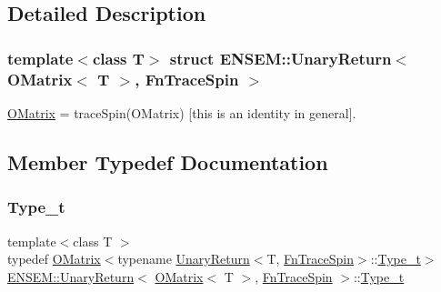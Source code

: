 \subsection{Detailed Description}
\subsubsection*{template$<$class T$>$\newline
struct E\+N\+S\+E\+M\+::\+Unary\+Return$<$ O\+Matrix$<$ T $>$, Fn\+Trace\+Spin $>$}

\mbox{\hyperlink{classENSEM_1_1OMatrix}{O\+Matrix}} = trace\+Spin(\+O\+Matrix) \mbox{[}this is an identity in general\mbox{]}. 

\subsection{Member Typedef Documentation}
\mbox{\label{structENSEM_1_1UnaryReturn_3_01OMatrix_3_01T_01_4_00_01FnTraceSpin_01_4_a9d6cbecc05de075e41d52fd0b7f2b55e}} 
\subsubsection{\texorpdfstring{Type\_t}{Type\_t}\hspace{0.1cm}{\footnotesize\ttfamily [1/3]}}
{\footnotesize\ttfamily template$<$class T $>$ \\
typedef \mbox{\hyperlink{classENSEM_1_1OMatrix}{O\+Matrix}}$<$typename \mbox{\hyperlink{structENSEM_1_1UnaryReturn}{Unary\+Return}}$<$T, \mbox{\hyperlink{structENSEM_1_1FnTraceSpin}{Fn\+Trace\+Spin}}$>$\+::\mbox{\hyperlink{structENSEM_1_1UnaryReturn_3_01OMatrix_3_01T_01_4_00_01FnTraceSpin_01_4_a9d6cbecc05de075e41d52fd0b7f2b55e}{Type\+\_\+t}}$>$ \mbox{\hyperlink{structENSEM_1_1UnaryReturn}{E\+N\+S\+E\+M\+::\+Unary\+Return}}$<$ \mbox{\hyperlink{classENSEM_1_1OMatrix}{O\+Matrix}}$<$ T $>$, \mbox{\hyperlink{structENSEM_1_1FnTraceSpin}{Fn\+Trace\+Spin}} $>$\+::\mbox{\hyperlink{structENSEM_1_1UnaryReturn_3_01OMatrix_3_01T_01_4_00_01FnTraceSpin_01_4_a9d6cbecc05de075e41d52fd0b7f2b55e}{Type\+\_\+t}}}

\mbox{\label{structENSEM_1_1UnaryReturn_3_01OMatrix_3_01T_01_4_00_01FnTraceSpin_01_4_a9d6cbecc05de075e41d52fd0b7f2b55e}} 
